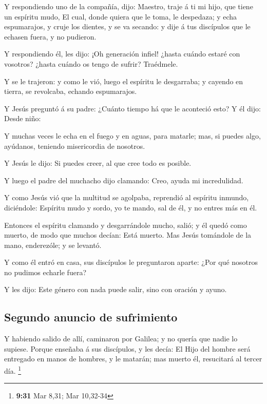  Y respondiendo uno de la compañía, dijo: Maestro, traje á
ti mi hijo, que tiene un espíritu mudo,  El cual, donde
quiera que le toma, le despedaza; y echa espumarajos, y cruje los
dientes, y se va secando: y dije á tus discípulos que le echasen fuera,
y no pudieron.

 Y respondiendo él, les dijo: ¡Oh generación infiel! ¿hasta
cuándo estaré con vosotros? ¿hasta cuándo os tengo de sufrir? Traédmele.

 Y se le trajeron: y como le vió, luego el espíritu le
desgarraba; y cayendo en tierra, se revolcaba, echando espumarajos.

 Y Jesús preguntó á su padre: ¿Cuánto tiempo há que le
aconteció esto? Y él dijo: Desde niño:

 Y muchas veces le echa en el fuego y en aguas, para
matarle; mas, si puedes algo, ayúdanos, teniendo misericordia de
nosotros.

 Y Jesús le dijo: Si puedes creer, al que cree todo es
posible.

 Y luego el padre del muchacho dijo clamando: Creo, ayuda
mi incredulidad.

 Y como Jesús vió que la multitud se agolpaba, reprendió al
espíritu inmundo, diciéndole: Espíritu mudo y sordo, yo te mando, sal de
él, y no entres más en él.

 Entonces el espíritu clamando y desgarrándole mucho,
salió; y él quedó como muerto, de modo que muchos decían: Está muerto.
 Mas Jesús tomándole de la mano, enderezóle; y se levantó.

 Y como él entró en casa, sus discípulos le preguntaron
aparte: ¿Por qué nosotros no pudimos echarle fuera?

 Y les dijo: Este género con nada puede salir, sino con
oración y ayuno.

\hypertarget{segundo-anuncio-de-sufrimiento}{%
\subsection{Segundo anuncio de
sufrimiento}\label{segundo-anuncio-de-sufrimiento}}

 Y habiendo salido de allí, caminaron por Galilea; y no
quería que nadie lo supiese.  Porque enseñaba á sus
discípulos, y les decía: El Hijo del hombre será entregado en manos de
hombres, y le matarán; mas muerto él, resucitará al tercer día.
\footnote{\textbf{9:31} Mar 8,31; Mar 10,32-34}


